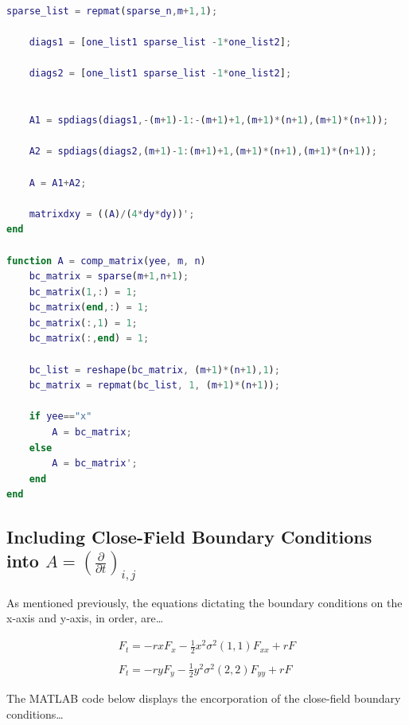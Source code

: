 \documentclass[12pt,letterpaper]{article}
\begin{document}
\begin{lstlisting}[language = Matlab]
    sparse_list = repmat(sparse_n,m+1,1);

    diags1 = [one_list1 sparse_list -1*one_list2];

    diags2 = [one_list1 sparse_list -1*one_list2];


    A1 = spdiags(diags1,-(m+1)-1:-(m+1)+1,(m+1)*(n+1),(m+1)*(n+1));

    A2 = spdiags(diags2,(m+1)-1:(m+1)+1,(m+1)*(n+1),(m+1)*(n+1));

    A = A1+A2;

    matrixdxy = ((A)/(4*dy*dy))';
end

function A = comp_matrix(yee, m, n)
    bc_matrix = sparse(m+1,n+1);
    bc_matrix(1,:) = 1;
    bc_matrix(end,:) = 1;
    bc_matrix(:,1) = 1;
    bc_matrix(:,end) = 1;
    
    bc_list = reshape(bc_matrix, (m+1)*(n+1),1);
    bc_matrix = repmat(bc_list, 1, (m+1)*(n+1));

    if yee=="x"
        A = bc_matrix;
    else
        A = bc_matrix';
    end
end
\end{lstlisting}

\subsection*{Including Close-Field Boundary Conditions into $A = \left(\frac{\partial}{\partial t}\right)_{i,j}$}

As mentioned previously, the equations dictating the boundary conditions on the x-axis and y-axis, in order, are\ldots

\begin{equation*}
\begin{matrix}
    F_{t} = -rxF_{x}-\frac{1}{2}x^{2}\sigma^{2}(1,1)F_{xx}+rF \\
    \\
    F_{t} = -ryF_{y}-\frac{1}{2}y^{2}\sigma^{2}(2,2)F_{yy}+rF
\end{matrix}
\end{equation*}

The MATLAB code below displays the encorporation of the close-field boundary conditions\ldots
\end{document}
